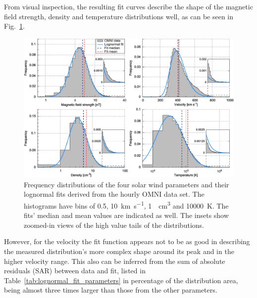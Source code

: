 \documentclass[]{aa}
\begin{document}
	From visual inspection, the resulting fit curves describe the shape of the magnetic field strength, density and temperature distributions well, as can be seen in Fig.~\ref{fig:histogram_fits_4_a_zoom_paper_pdfplot}.
	\begin{figure}
		\includegraphics[width=18cm]{figures/histogram_fits_4_a_zoom_paper_pdfplot.pdf}
		\caption{Frequency distributions of the four solar wind parameters and their lognormal fits derived from the hourly OMNI data set. The histograms have bins of \SI{0.5}{\nT}, \SI{10}{\km\per\s}, \SI{1}{\per\cm\cubed} and \SI{10000}{\K}. The fits' median and mean values are indicated as well. The insets show zoomed-in views of the high value tails of the distributions.}
		\label{fig:histogram_fits_4_a_zoom_paper_pdfplot}
	\end{figure}
	However, for the velocity the fit function appears not to be as good in describing the measured distribution’s more complex shape around its peak and in the higher velocity range. This also can be inferred from the sum of absolute residuals (SAR) between data and fit, listed in Table~\ref{tab:lognormal_fit_parameters} in percentage of the distribution area, being almost three times larger than those from the other parameters.
\end{document}
